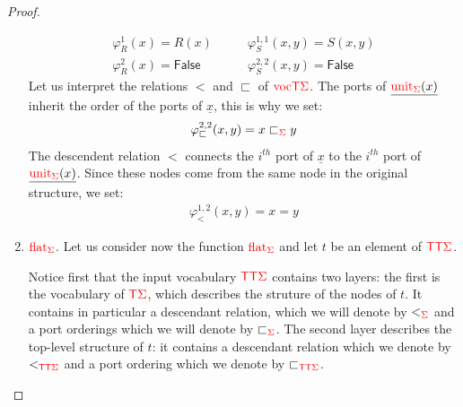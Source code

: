 \begin{proof}
\begin{enumerate}
    \begin{align*}
   \varphi_R^{1}(x)=R(x) \quad&\quad \varphi_S^{1,1}(x,y)=S(x,y)\\
   \varphi_R^{2}(x)=\mathsf{False} \quad&\quad \varphi_S^{2,2}(x,y)=\mathsf{False}
\end{align*}      
Let us interpret the relations $<$ and $\sqsubset$ of ${\color{red}{\mathrm{voc}}}{\color{red}{\mathsf T}}{\color{red}{\Sigma}}$. The  ports of $\underline{{\color{red}{\mathrm{unit}}}_{\color{red}{\Sigma}}(x)}$ inherit the order of the ports of $\underline{x}$, this is why we set:
\begin{align*}
\varphi_\sqsubset^{2,2}(x,y)=x\sqsubset_{\color{red}{\Sigma}} y
\end{align*}
The descendent relation $<$ connects the $i^{th}$ port of $\underline{x}$ to the $i^{th}$ port of $\underline{{\color{red}{\mathrm{unit}}}_{\color{red}{\Sigma}}(x)}$. Since these nodes come from the same node in the original structure, we set:
\begin{align*}
\varphi_<^{1,2}(x,y)=x=y
\end{align*}
 \item {${\color{red}{\mathrm{flat}}}_{\color{red}{\Sigma}}$}. Let us consider now the function ${\color{red}{\mathrm{flat}}}_{\color{red}{\Sigma}}$ and let $t$ be an element of ${\color{red}{\mathsf T}}{\color{red}{\mathsf T}}{\color{red}{\Sigma}}$. 
 
Notice first that the input vocabulary ${\color{red}{\mathsf T}}{\color{red}{\mathsf T}}{\color{red}{\Sigma}}$ contains two layers: the first is the vocabulary of ${\color{red}{\mathsf T}} {\color{red}{\Sigma}}$, which describes the struture of the nodes of $t$. It contains in particular a descendant relation, which we will denote by $<_{\color{red}{\Sigma}}$ and a port orderings which we will denote by $\sqsubset_{\color{red}{\Sigma}}$. The second layer describes the top-level structure of $t$: it contains a descendant relation which we denote by $<_{{\color{red}{\mathsf T}}{\color{red}{\mathsf T}}{\color{red}{\Sigma}}}$ and a port ordering which we denote by $\sqsubset_{{\color{red}{\mathsf T}}{\color{red}{\mathsf T}}{\color{red}{\Sigma}}}$.


\end{enumerate}
\end{proof}
